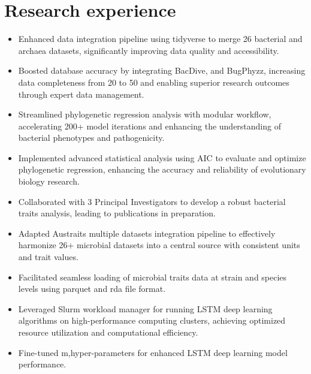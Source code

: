 \documentclass[12pt,a4paper,sans]{moderncv} %
\begin{document}
\section{Research experience}

{
}
{
    \begin{itemize} 
        \item Enhanced data integration pipeline using tidyverse to merge 26 bacterial and archaea datasets, significantly improving data quality and accessibility. 
        \item Boosted database accuracy by integrating BacDive, and BugPhyzz, increasing data completeness from 20 to 50 and enabling superior research outcomes through expert data management. 
        \item Streamlined phylogenetic regression analysis with modular workflow, accelerating 200+ model iterations and enhancing the understanding of bacterial phenotypes and pathogenicity.
        \item Implemented advanced statistical analysis using AIC to evaluate and optimize phylogenetic regression, enhancing the accuracy and reliability of evolutionary biology research.
        \item Collaborated with 3 Principal Investigators to develop a robust bacterial traits analysis, leading to publications in preparation.
    \end{itemize}
}
{
    \begin{itemize} 
        \item Adapted Austraits multiple datasets integration pipeline to effectively harmonize 26+ microbial datasets into a central source with consistent units and trait values. 
        \item Facilitated seamless loading of microbial traits data at strain and species levels using parquet and rda file format.
    \end{itemize}
}

{
    \begin{itemize}
        \item Leveraged Slurm workload manager for running LSTM deep learning algorithms on high-performance computing clusters, achieving optimized resource utilization and computational efficiency. 
        \item Fine-tuned m,hyper-parameters for enhanced LSTM deep learning model performance.
    \end{itemize}
}
\end{document}
